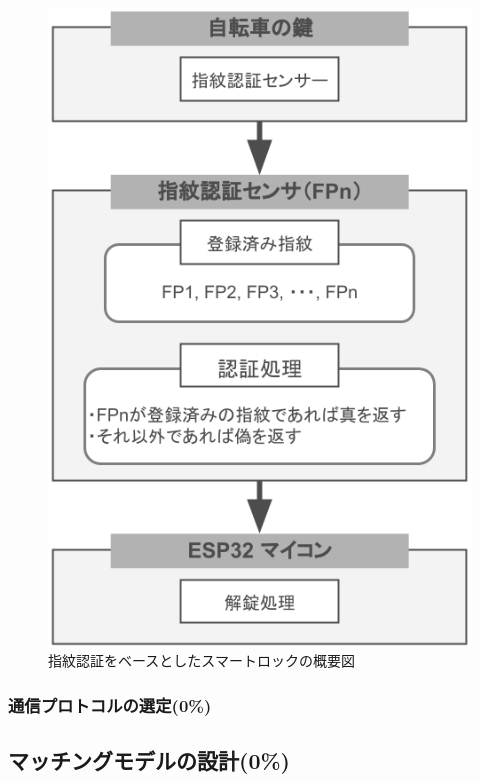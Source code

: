           \begin{figure}[htbp]
            \centering
            \includegraphics[scale=0.46]
            {figures/overallImageOfFingerprintUnlock.png}
            \caption{指紋認証をベースとしたスマートロックの概要図}
            \label{fig:指紋認証をベースとしたスマートロックの概要図}
          \end{figure}
          
      \subsubsection{通信プロトコルの選定(0\%)}
        \label{sec:通信プロトコルの選定}
          \par
          
  \subsection{マッチングモデルの設計(0\%)}
    \label{sec:マッチングモデルの設計}
      \par

